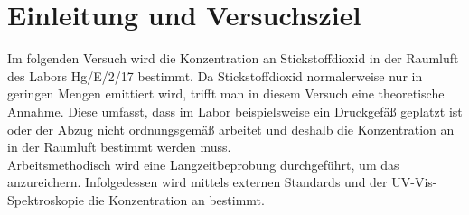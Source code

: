 \section{Einleitung und Versuchsziel}
\label{sec:aufgabenstellung}

Im folgenden Versuch wird die Konzentration an Stickstoffdioxid in der Raumluft des Labors Hg/E/2/17 bestimmt. Da Stickstoffdioxid normalerweise nur in geringen Mengen emittiert wird, trifft man in diesem Versuch eine theoretische Annahme. Diese umfasst, dass im Labor beispielsweise ein Druckgefäß geplatzt ist oder der Abzug nicht ordnungsgemäß arbeitet und deshalb die Konzentration an  in der Raumluft bestimmt werden muss.\\
Arbeitsmethodisch wird eine Langzeitbeprobung durchgeführt, um das  anzureichern. Infolgedessen wird mittels externen Standards und der UV-Vis-Spektroskopie die Konzentration an  bestimmt.
